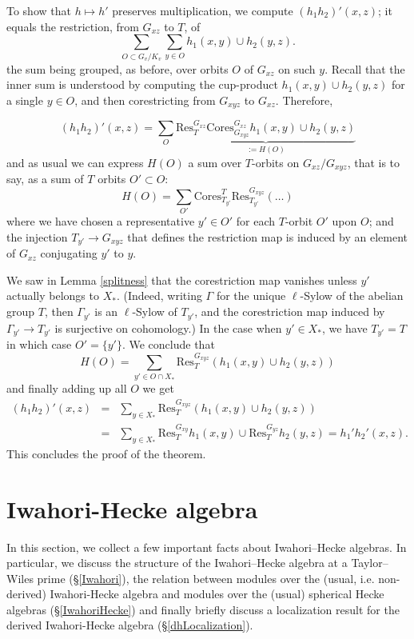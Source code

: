 \documentclass[10pt]{amsart}
\theoremstyle{remark}
\begin{document}
     

To show that  $h \mapsto h'$ preserves multiplication, we compute $(h_1 h_2)'(x,z)$; it equals  the restriction, from $G_{xz}$ to $T$, of
 $$ \sum_{O \subset G_v/K_v} \sum_{y \in O} h_1(x,y) \cup h_2(y,z).$$
the sum being grouped, as before, over orbits $O$ of $G_{xz}$ on such $y$. 
Recall that the inner sum  is understood by computing the cup-product $h_1(x,y) \cup h_2(y,z)$ for a single $y \in O$, 
and then corestricting from $G_{xyz}$ to $G_{xz}$.  
Therefore,

$$(h_1 h_2)'(x,z)  = \sum_{O}  \underbrace{ \mathrm{Res}^{G_{xz}}_T \mathrm{Cores}^{G_{xz}}_{G_{xyz}} h_1(x,y) \cup h_2(y,z) }_{:= H(O)}$$
and as usual we can express $H(O)$ a sum over
 $T$-orbits on $G_{xz}/G_{xyz}$, that is to say, as a sum of $T$ orbits  $O' \subset O$:
\begin{equation} \label{yuk}  H(O) =\sum_{O'} \mathrm{Cores}^{T}_{T_{y'}} \mathrm{Res}^{G_{xyz}}_{T_{y'}} (\dots )\end{equation}
where we have chosen a representative $y' \in O'$ for each $T$-orbit $O'$ upon $O$; and
  the  injection $T_{y'} \rightarrow G_{xyz}$ that defines the restriction map is induced by an element of $G_{xz}$
conjugating $y'$ to $y$. 

We saw  in Lemma \ref{splitness} that the corestriction map vanishes unless $y'$ actually belongs to $X_*$. 
(Indeed, writing $\Gamma$ for the unique $\ell$-Sylow of  the abelian group $T$, 
then $\Gamma_{y'}$ is an $\ell$-Sylow of $T_{y'}$,
and the corestriction map induced by $\Gamma_{y'} \rightarrow T_{y'}$ is surjective on cohomology.)
%
In the case when $y' \in X_*$, we have  $T_{y'} = T$ in which case $O' = \{y'\}$. We conclude that 
$$H(O) =\sum_{y' \in O \cap X_*}  \mathrm{Res}^{G_{xyz}}_{T}(h_1(x,y) \cup h_2(y,z))%
%
$$
%
and finally adding up all $O$ we get
\begin{eqnarray*}(h_1 h_2)'(x,z) &=& \sum_{y \in X_*}  \mathrm{Res}^{G_{xyz}}_{T} (h_1(x,y) \cup h_2(y,z) ) \\ 
 &=& \sum_{y \in X_*}  \mathrm{Res}^{G_{xy}}_{T}  h_1(x,y) \cup  \mathrm{Res}^{G_{yz}}_{T}  h_2(y,z)  =   h_1' h_2' (x,z).\end{eqnarray*}
This concludes the proof of the theorem. 
 
 \section{Iwahori-Hecke algebra}\label{IHA}
 In this section, we collect a few important facts about Iwahori--Hecke algebras. 
In particular, we discuss the structure of the Iwahori--Hecke algebra at a Taylor--Wiles prime (\S \ref{Iwahori}), the
relation between modules over the (usual, i.e. non-derived) Iwahori-Hecke algebra
and modules over the (usual) spherical Hecke algebras (\S \ref{IwahoriHecke})
and finally briefly discuss a localization result for the derived Iwahori-Hecke algebra
(\S \ref{dhLocalization}). 
\end{document}
